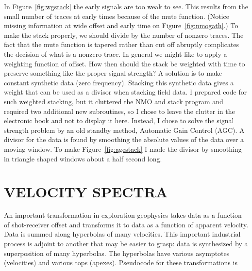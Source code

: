 In Figure~\ref{fig:wgstack} the early signals are too weak to see.
This results from the small number of traces
at early times because of the mute function.
(Notice missing information at wide offset and early time
on Figure~\ref{fig:nmogath}.)
To make the stack properly, we should divide by the number of nonzero traces.
The fact that the mute function is tapered rather than cut off abruptly
complicates the decision of what is a nonzero trace.
In general we might like to apply a weighting function of offset.
How then should the stack be weighted with time to preserve
something like the proper signal strength?
A solution is to make constant synthetic data (zero frequency).
Stacking this synthetic data gives a weight that can be used
as a divisor when stacking field data.
I prepared code for such weighted stacking,
but it cluttered the NMO and stack program and required
two additional new subroutines,
so I chose to leave the clutter in the electronic book
and not to display it here.
Instead, I chose to solve the signal strength problem
by an old standby method, Automatic Gain Control (AGC).
A divisor for the data is found by smoothing the absolute
values of the data over a moving window.
To make Figure~\ref{fig:agcstack} I made the divisor by smoothing
in triangle shaped windows about a half second long.


%
%
%

\section{VELOCITY SPECTRA}
An important transformation in exploration geophysics
takes data as a function of shot-receiver offset
and transforms it to data as a function of apparent velocity.
Data is summed along hyperbolas of many velocities.
This important industrial process is adjoint to another that may
be easier to grasp:  data is synthesized by a superposition
of many hyperbolas.
The hyperbolas have various asymptotes (velocities) and various
tops (apexes).
Pseudocode for these transformations is
\par\noindent

